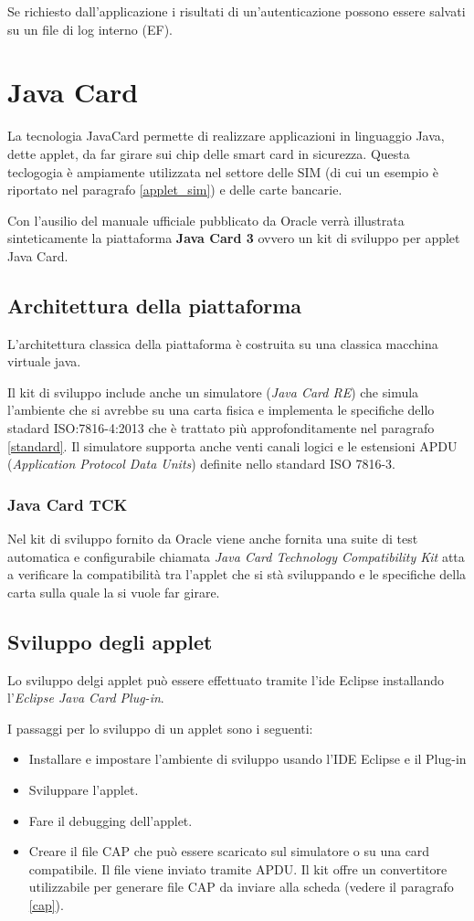 Se richiesto dall'applicazione i risultati di un'autenticazione possono essere salvati su un file di log interno (EF).
\cite{isoiec3}

\section{Java Card}
\label{java_card}
La tecnologia JavaCard permette di realizzare applicazioni in linguaggio Java, dette applet, da far girare sui chip delle smart card in sicurezza. Questa teclogogia è ampiamente utilizzata nel settore delle SIM (di cui un esempio è riportato nel paragrafo \ref{applet_sim}) e delle carte bancarie.
\cite{Wiki_java}

Con l'ausilio del manuale ufficiale pubblicato da Oracle \cite{javacard3platform} verrà illustrata sinteticamente la piattaforma \textbf{Java Card 3} ovvero un kit di sviluppo per applet Java Card.
\subsection{Architettura della piattaforma}
L'architettura classica della piattaforma è costruita su una classica macchina virtuale java.

Il kit di sviluppo include anche un simulatore (\textit{Java Card RE}) che simula l'ambiente che si avrebbe su una carta fisica e implementa le specifiche dello stadard ISO:7816-4:2013 che è trattato più approfonditamente nel paragrafo \ref{standard}. Il simulatore supporta anche venti canali logici e le estensioni APDU (\textit{Application Protocol Data Units}) definite nello standard ISO 7816-3.
\subsubsection{Java Card TCK}
Nel kit di sviluppo fornito da Oracle viene anche fornita una suite di test automatica e configurabile chiamata \textit{Java Card Technology Compatibility Kit} atta a verificare la compatibilità tra l'applet che si stà sviluppando e le specifiche della carta sulla quale la si vuole far girare.

\subsection{Sviluppo degli applet}
Lo sviluppo delgi applet può essere effettuato tramite l'ide Eclipse installando l'\textit{Eclipse Java Card Plug-in}.

I passaggi per lo sviluppo di un applet sono i seguenti:
\begin{itemize}
    \item Installare e impostare l'ambiente di sviluppo usando l'IDE Eclipse e il Plug-in
    \item Sviluppare l'applet.
    \item Fare il debugging dell'applet.
    \item Creare il file CAP che può essere scaricato sul simulatore o su una card compatibile. Il file viene inviato tramite APDU. Il kit offre un convertitore utilizzabile per generare file CAP da inviare alla scheda (vedere il paragrafo \ref{cap}).
\end{itemize}

